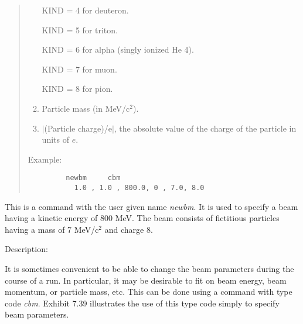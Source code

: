 \begin{quotation}
\begin{enumerate}
             KIND = 4 for deuteron.

             KIND = 5 for triton.

             KIND = 6 for alpha (singly ionized He 4).

             KIND = 7 for muon.

             KIND = 8 for pion.

      \item  Particle mass (in MeV/c$^2$).

      \item  $|$(Particle charge)/e$|$, the absolute value of the charge of the particle in units of $e$.

\end{enumerate}

\vspace{5mm}
\noindent Example:
\begin{verbatim}
         newbm     cbm
           1.0 , 1.0 , 800.0, 0 , 7.0, 8.0
\end{verbatim}
\end{quotation}
This is a command with the user given name {\em newbm}.  It is used to specify a beam having a kinetic energy of 800 MeV.  The beam consists of fictitious particles having a mass of 7 MeV/c$^2$ and charge 8.

\vspace{5mm}
     Description:
\vspace{2mm}

It is sometimes convenient to be able to change the beam parameters during the course of a \Mary run.  In particular, it may be desirable to fit on beam energy, beam momentum, or particle mass, etc.  This can be done using a command with type code {\em cbm}.  Exhibit 7.39 illustrates the use of this type code simply to specify beam parameters.       

